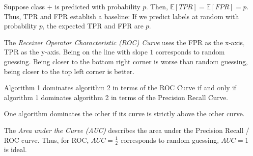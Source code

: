 Suppose class $+$ is predicted with probability $p$.
Then, $\mathbb{E}[TPR] = \mathbb{E}[FPR] = p$.
Thus, TPR and FPR establish a baseline:
If we predict labels at random with probability $p$,
the expected TPR and FPR are $p$.

The \emph{Receiver Operator Characteristic (ROC) Curve}
uses the FPR as the x-axis, TPR as the y-axis.
Being on the line with slope $1$ corresponds to random
guessing. Being closer to the bottom right corner is worse
than random guessing, being closer to the top left corner
is better.

\begin{theorem}
    Algorithm 1 dominates algorithm 2 in terms of the
    ROC Curve if and only if
    algorithm 1 dominates algorithm 2 in terms of the
    Precision Recall Curve.
    
    One algorithm dominates the other if its curve
    is strictly above the other curve.
\end{theorem}

The \emph{Area under the Curve (AUC)} describes the
area under the Precision Recall / ROC curve.
Thus, for ROC, $AUC = \frac{1}{2}$ corresponds to random
guessing, $AUC = 1$ is ideal.
